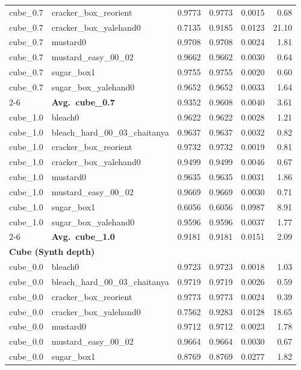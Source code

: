 \begin{longtable}{llrrrr}
  cube_0.7 & cracker\_box\_reorient & 0.9773 & 0.9773 & 0.0015 & 0.68 \\
  cube_0.7 & cracker\_box\_yalehand0 & 0.7135 & 0.9185 & 0.0123 & 21.10 \\
  cube_0.7 & mustard0 & 0.9708 & 0.9708 & 0.0024 & 1.81 \\
  cube_0.7 & mustard\_easy\_00\_02 & 0.9662 & 0.9662 & 0.0030 & 0.64 \\
  cube_0.7 & sugar\_box1 & 0.9755 & 0.9755 & 0.0020 & 0.60 \\
  cube_0.7 & sugar\_box\_yalehand0 & 0.9652 & 0.9652 & 0.0033 & 1.64 \\
  \cmidrule{2-6}
  & \textbf{Avg.~cube_0.7} & 0.9352 & 0.9608 & 0.0040 & 3.61 \\
  \midrule
  cube_1.0 & bleach0 & 0.9622 & 0.9622 & 0.0028 & 1.21 \\
  cube_1.0 & bleach\_hard\_00\_03\_chaitanya & 0.9637 & 0.9637 & 0.0032 & 0.82 \\
  cube_1.0 & cracker\_box\_reorient & 0.9732 & 0.9732 & 0.0019 & 0.81 \\
  cube_1.0 & cracker\_box\_yalehand0 & 0.9499 & 0.9499 & 0.0046 & 0.67 \\
  cube_1.0 & mustard0 & 0.9635 & 0.9635 & 0.0031 & 1.86 \\
  cube_1.0 & mustard\_easy\_00\_02 & 0.9669 & 0.9669 & 0.0030 & 0.71 \\
  cube_1.0 & sugar\_box1 & 0.6056 & 0.6056 & 0.0987 & 8.91 \\
  cube_1.0 & sugar\_box\_yalehand0 & 0.9596 & 0.9596 & 0.0037 & 1.77 \\
  \cmidrule{2-6}
  & \textbf{Avg.~cube_1.0} & 0.9181 & 0.9181 & 0.0151 & 2.09 \\
  \midrule
\multicolumn{6}{l}{\textbf{Cube (Synth depth)}} \\
\midrule
  cube_0.0 & bleach0 & 0.9723 & 0.9723 & 0.0018 & 1.03 \\
  cube_0.0 & bleach\_hard\_00\_03\_chaitanya & 0.9719 & 0.9719 & 0.0026 & 0.59 \\
  cube_0.0 & cracker\_box\_reorient & 0.9773 & 0.9773 & 0.0024 & 0.39 \\
  cube_0.0 & cracker\_box\_yalehand0 & 0.7562 & 0.9283 & 0.0128 & 18.65 \\
  cube_0.0 & mustard0 & 0.9712 & 0.9712 & 0.0023 & 1.78 \\
  cube_0.0 & mustard\_easy\_00\_02 & 0.9664 & 0.9664 & 0.0030 & 0.67 \\
  cube_0.0 & sugar\_box1 & 0.8769 & 0.8769 & 0.0277 & 1.82 \\

\end{longtable}

